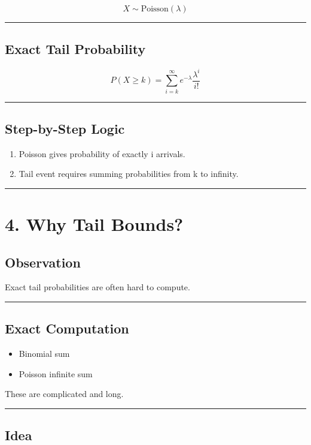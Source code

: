 \documentclass[12pt]{article}
\begin{document}
\[
X \sim \text{Poisson}(\lambda)
\]

\hrule

\subsection*{Exact Tail Probability}

\[
P(X \geq k) = \sum_{i=k}^{\infty} e^{-\lambda} \frac{\lambda^i}{i!}
\]

\hrule

\subsection*{Step-by-Step Logic}

\begin{enumerate}
\item Poisson gives probability of exactly i arrivals.
\item Tail event requires summing probabilities from k to infinity.
\end{enumerate}

\hrule

\section*{4. Why Tail Bounds?}

\subsection*{Observation}

Exact tail probabilities are often hard to compute.

\hrule

\subsection*{Exact Computation}

\begin{itemize}
\item Binomial sum
\item Poisson infinite sum
\end{itemize}

These are complicated and long.

\hrule

\subsection*{Idea}
\end{document}
